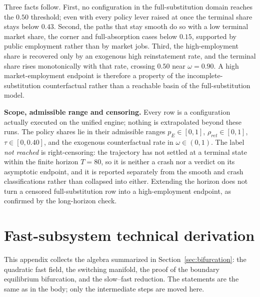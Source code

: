 \documentclass[review,12pt]{elsarticle}
\theoremstyle{plain}
\theoremstyle{definition}
\theoremstyle{remark}
\begin{document}
Three facts follow. First, no configuration in the full-substitution domain
reaches the $0.50$ threshold; even with every policy lever raised at once the
terminal share stays below $0.43$. Second, the paths that stay smooth do so
with a low terminal market share, the corner and full-absorption cases below
$0.15$, supported by public employment rather than by market jobs. Third, the
high-employment share is recovered only by an exogenous high reinstatement
rate, and the terminal share rises monotonically with that rate, crossing
$0.50$ near $\omega=0.90$. A high market-employment endpoint is therefore a
property of the incomplete-substitution counterfactual rather than a reachable
basin of the full-substitution model.

\smallskip\noindent\textbf{Scope, admissible range and censoring.}
Every row is a configuration actually executed on the unified engine; nothing is extrapolated beyond these runs. The policy shares lie in their admissible ranges $p_E\in[0,1]$, $\rho_{ret}\in[0,1]$, $\tau\in[0,0.40]$, and the exogenous counterfactual rate in $\omega\in(0,1)$. The label \emph{not reached} is right-censoring: the trajectory has not settled at a terminal state within the finite horizon $T=80$, so it is neither a crash nor a verdict on its asymptotic endpoint, and it is reported separately from the smooth and crash classifications rather than collapsed into either. Extending the horizon does not turn a censored full-substitution row into a high-employment endpoint, as confirmed by the long-horizon check.

\section{Fast-subsystem technical derivation}
\label{app:fast-derivation}
This appendix collects the algebra summarized in
Section~\ref{sec:bifurcation}: the quadratic fast field, the switching
manifold, the proof of the boundary equilibrium bifurcation, and the
slow--fast reduction. The statements are the same as in the body; only the
intermediate steps are moved here.
\end{document}

